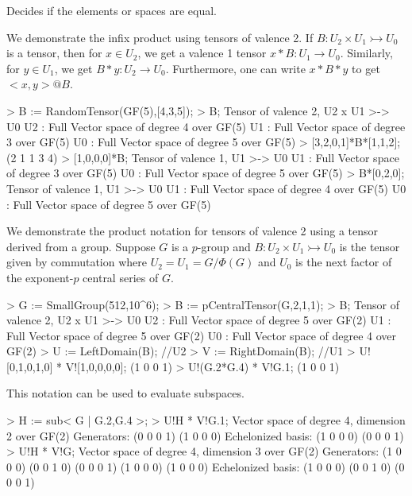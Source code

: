 Decides if the elements or spaces are equal.

\begin{example}
We demonstrate the infix product using tensors of valence 2. 
If $B : U_2\times U_1\rightarrowtail U_0$ is a tensor, then for $x\in U_2$, we get a valence 1 tensor $x*B : U_1\rightarrow U_0$.
Similarly, for $y\in U_1$, we get $B*y : U_2\rightarrow U_0$. Furthermore, one can write $x*B*y$ to get $<x,y> @B$.

\begin{code}
> B := RandomTensor(GF(5),[4,3,5]);
> B;
Tensor of valence 2, U2 x U1 >-> U0
U2 : Full Vector space of degree 4 over GF(5)
U1 : Full Vector space of degree 3 over GF(5)
U0 : Full Vector space of degree 5 over GF(5)
> [3,2,0,1]*B*[1,1,2];
(2 1 1 3 4)
> [1,0,0,0]*B;
Tensor of valence 1, U1 >-> U0
U1 : Full Vector space of degree 3 over GF(5)
U0 : Full Vector space of degree 5 over GF(5)
> B*[0,2,0];
Tensor of valence 1, U1 >-> U0
U1 : Full Vector space of degree 4 over GF(5)
U0 : Full Vector space of degree 5 over GF(5)
\end{code}
\end{example}

\begin{example}
We demonstrate the product notation for tensors of valence 2 using a tensor derived from a group. 
Suppose $G$ is a $p$-group and $B : U_2\times U_1\rightarrowtail U_0$ is the tensor given by commutation where $U_2=U_1=G/\Phi(G)$ and $U_0$ is the next factor of the exponent-$p$ central series of $G$.

\begin{code}
> G := SmallGroup(512,10^6);
> B := pCentralTensor(G,2,1,1);
> B;
Tensor of valence 2, U2 x U1 >-> U0
U2 : Full Vector space of degree 5 over GF(2)
U1 : Full Vector space of degree 5 over GF(2)
U0 : Full Vector space of degree 4 over GF(2)
> U := LeftDomain(B);   //U2
> V := RightDomain(B);  //U1
> U![0,1,0,1,0] * V![1,0,0,0,0];
(1 0 0 1)
> U!(G.2*G.4) * V!G.1;
(1 0 0 1)
\end{code}

This notation can be used to evaluate subspaces.

\begin{code}
> H := sub< G | G.2,G.4 >;
> U!H * V!G.1;
Vector space of degree 4, dimension 2 over GF(2)
Generators:
(0 0 0 1)
(1 0 0 0)
Echelonized basis:
(1 0 0 0)
(0 0 0 1)
> U!H * V!G;
Vector space of degree 4, dimension 3 over GF(2)
Generators:
(1 0 0 0)
(0 0 1 0)
(0 0 0 1)
(1 0 0 0)
(1 0 0 0)
Echelonized basis:
(1 0 0 0)
(0 0 1 0)
(0 0 0 1)
\end{code}
\end{example}

